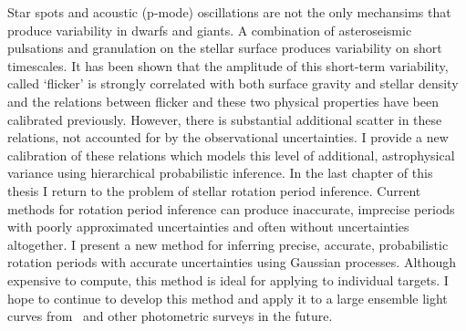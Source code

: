 Star spots and acoustic (p-mode) oscillations are not the only mechansims
that produce variability in dwarfs and giants.
A combination of asteroseismic pulsations and granulation on the stellar
surface produces variability on short timescales.
It has been shown that the amplitude of this short-term variability, called
`flicker' is strongly correlated with both surface gravity and stellar
density and the relations between flicker and these two physical properties
have been calibrated previously.
However, there is substantial additional scatter in these relations, not
accounted for by the observational uncertainties.
I provide a new calibration of these relations which models this level of
additional, astrophysical variance using hierarchical probabilistic inference.
In the last chapter of this thesis I return to the problem of stellar rotation
period inference.
Current methods for rotation period inference can produce inaccurate,
imprecise periods with poorly approximated uncertainties and often without
uncertainties altogether.
I present a new method for inferring precise, accurate, probabilistic rotation
periods with accurate uncertainties using Gaussian processes.
Although expensive to compute, this method is ideal for applying to individual
targets.
I hope to continue to develop this method and apply it to a large ensemble
light curves from \kepler\ and other photometric surveys in the future.
